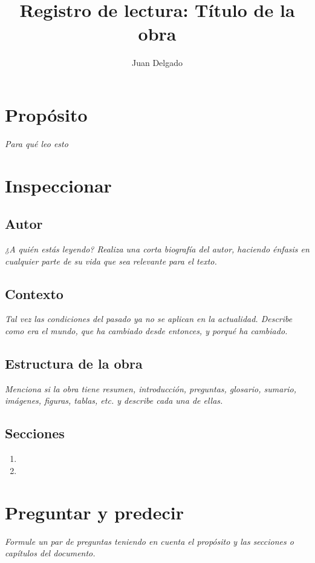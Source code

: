 \documentclass[11pt,letterpaper]{article}
\author{Juan Delgado}
\title{Registro de lectura: Título de la obra}
\begin{document}
\maketitle

\section{Propósito}
\textit{Para qué leo esto}

\section{Inspeccionar}

\subsection{Autor}
\textit{¿A quién estás leyendo? Realiza una corta biografía del autor, haciendo énfasis en cualquier parte de su vida que sea relevante para el texto.}

\subsection{Contexto}
\textit{Tal vez las condiciones del pasado ya no se aplican en la actualidad. Describe como era el mundo, que ha cambiado desde entonces, y porqué ha cambiado.}

\subsection{Estructura de la obra}
\textit{Menciona si la obra tiene resumen, introducción, preguntas, glosario, sumario, imágenes, figuras, tablas, etc. y describe cada una de ellas.}

\subsection{Secciones}
\begin{enumerate}
	\item 
	\item
\end{enumerate}

\section{Preguntar y predecir}
\textit{Formule un par de preguntas teniendo en cuenta el propósito y las secciones o capítulos del documento.}
\end{document}
